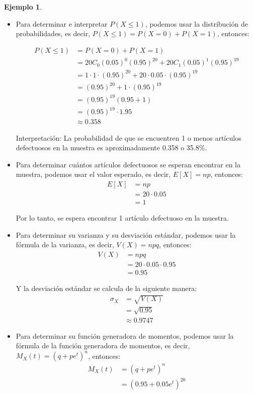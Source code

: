 \documentclass{article}
\theoremstyle{definition}
\newtheorem{example}[definition]{Ejemplo}
\theoremstyle{plain}
\theoremstyle{remark}
\begin{document}
\begin{example}
\begin{itemize}
\item Para determinar e interpretar $P(X \leq 1)$, podemos usar la distribución de probabilidades, es decir, $P(X \leq 1) = P(X = 0) + P(X = 1)$, entonces:

\begin{align*}
P(X \leq 1) &= P(X = 0) + P(X = 1) \\
&= 20 C_0 (0.05)^0 (0.95)^{20} + 20 C_1 (0.05)^1 (0.95)^{19} \\
&= 1 \cdot 1 \cdot (0.95)^{20} + 20 \cdot 0.05 \cdot (0.95)^{19} \\
&= (0.95)^{20} + 1 \cdot (0.95)^{19} \\
&= (0.95)^{19} (0.95 + 1) \\
&= (0.95)^{19} \cdot 1.95 \\
&\approx 0.358
\end{align*}

Interpretación: La probabilidad de que se encuentren 1 o menos artículos defectuosos en la muestra es aproximadamente 0.358 o 35.8\%.

\item Para determinar cuántos artículos defectuosos se esperan encontrar en la muestra, podemos usar el valor esperado, es decir, $E[X] = np$, entonces:
\begin{align*}
E[X] &= np \\
&= 20 \cdot 0.05 \\
&= 1
\end{align*}

Por lo tanto, se espera encontrar 1 artículo defectuoso en la muestra.

\item Para determinar su varianza y su desviación estándar, podemos usar la fórmula de la varianza, es decir, $V(X) = npq$, entonces:
\begin{align*}
V(X) &= npq \\
&= 20 \cdot 0.05 \cdot 0.95 \\
&= 0.95
\end{align*}

Y la desviación estándar se calcula de la siguiente manera:
\begin{align*}
\sigma_X &= \sqrt{V(X)} \\
&= \sqrt{0.95} \\
&\approx 0.9747
\end{align*}

\item Para determinar su función generadora de momentos, podemos usar la fórmula de la función generadora de momentos, es decir, $M_X(t) = (q + pe^{t})^n$, entonces:
\begin{align*}
M_X(t) &= (q + pe^{t})^n \\
&= (0.95 + 0.05 e^{t})^{20}
\end{align*}

\end{itemize}

\end{example}
\end{document}
